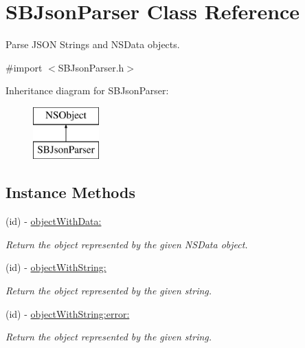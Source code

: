 \hypertarget{interface_s_b_json_parser}{\section{S\-B\-Json\-Parser Class Reference}
\label{interface_s_b_json_parser}
}


Parse J\-S\-O\-N Strings and N\-S\-Data objects.  




{\ttfamily \#import $<$S\-B\-Json\-Parser.\-h$>$}

Inheritance diagram for S\-B\-Json\-Parser\-:\begin{figure}[H]
\begin{center}
\leavevmode
\includegraphics[height=2.000000cm]{interface_s_b_json_parser}
\end{center}
\end{figure}
\subsection*{Instance Methods}
\begin{DoxyCompactItemize}
\item 
(id) -\/ \hyperlink{interface_s_b_json_parser_a66d7be591cdf0d9ee85c21c863ef5cbf}{object\-With\-Data\-:}
\begin{DoxyCompactList}\small\item\em Return the object represented by the given N\-S\-Data object. \end{DoxyCompactList}\item 
(id) -\/ \hyperlink{interface_s_b_json_parser_a1ec40b986576044d58d30172b141c74c}{object\-With\-String\-:}
\begin{DoxyCompactList}\small\item\em Return the object represented by the given string. \end{DoxyCompactList}\item 
(id) -\/ \hyperlink{interface_s_b_json_parser_a7a7fff47f41a08fa0defc4f628846e15}{object\-With\-String\-:error\-:}
\begin{DoxyCompactList}\small\item\em Return the object represented by the given string. \end{DoxyCompactList}\end{DoxyCompactItemize}
